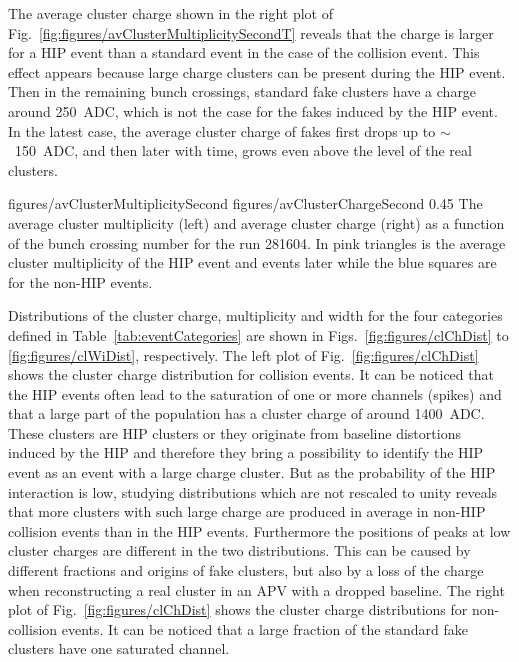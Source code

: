 The average cluster charge shown in the right plot of Fig.~\ref{fig:figures/avClusterMultiplicitySecondT} reveals that the charge is larger for a HIP event than a standard event in the case of the collision event. This effect appears because large charge clusters can be present during the HIP event. Then in the remaining bunch crossings, standard fake clusters have a charge around 250~ADC, which is not the case for the fakes induced by the HIP event. In the latest case, the average cluster charge of fakes first drops up to $\sim$~150~ADC, and then later with time, grows even above the level of the real clusters. 


                 {figures/avClusterMultiplicitySecond} %
                 {figures/avClusterChargeSecond} %
                 {0.45}       %
                 { The average cluster multiplicity (left) and average cluster charge (right) as a function of the bunch crossing number for the run 281604. In pink triangles is the average cluster multiplicity of the HIP event and events later while the blue squares are for the non-HIP events.  } %



Distributions of the cluster charge, multiplicity and width for the four categories defined in Table~\ref{tab:eventCategories} are shown in Figs.~\ref{fig:figures/clChDist} to \ref{fig:figures/clWiDist}, respectively. The left plot of Fig.~\ref{fig:figures/clChDist} shows the cluster charge distribution for collision events. It can be noticed that the HIP events often lead to the saturation of one or more channels (spikes) and that  a large part of the population has a cluster charge of around 1400~ADC. These clusters are HIP clusters or they originate from baseline distortions induced by the HIP and therefore they bring a possibility to identify the HIP event as an event with a large charge cluster. But as the probability of the HIP interaction is low, studying distributions which are not rescaled to unity reveals that  more clusters with such large charge are produced in average in non-HIP collision events than in the HIP events. Furthermore the positions of peaks at low cluster charges are different in the two distributions. This can be caused by different fractions and origins of fake clusters, but also by a loss of the charge when reconstructing a real cluster in an APV with a dropped baseline. The right plot of Fig.~\ref{fig:figures/clChDist} shows the cluster charge distributions for non-collision events. It can be noticed that a large fraction of the standard fake clusters have one saturated channel. 

